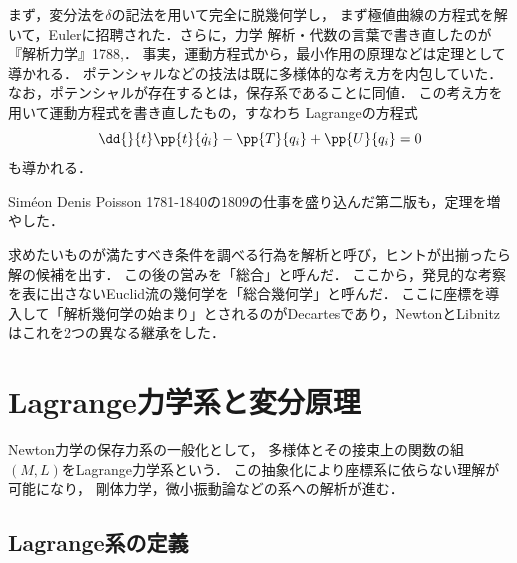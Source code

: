 \documentclass[uplatex,dvipdfmx]{jsreport}
\begin{document}
\begin{history}
    まず，変分法を$\delta$の記法を用いて完全に脱幾何学し，
    まず極値曲線の方程式を解いて，Eulerに招聘された．さらに，力学
    解析・代数の言葉で書き直したのが『解析力学』1788,\cite{Lagrange1788}．
    事実，運動方程式から，最小作用の原理などは定理として導かれる．
    ポテンシャルなどの技法は既に多様体的な考え方を内包していた．なお，ポテンシャルが存在するとは，保存系であることに同値．
    この考え方を用いて運動方程式を書き直したもの，すなわち
    Lagrangeの方程式
    \[\dd{}{t}\pp{t}{\dot{q}_i}-\pp{T}{q_i}+\pp{U}{q_i}=0\]
    も導かれる．

    Siméon Denis Poisson 1781-1840の1809の仕事を盛り込んだ第二版も，定理を増やした．
\end{history}

\begin{history}[解析の時代]
    求めたいものが満たすべき条件を調べる行為を解析と呼び，ヒントが出揃ったら解の候補を出す．
    この後の営みを「総合」と呼んだ．
    ここから，発見的な考察を表に出さないEuclid流の幾何学を「総合幾何学」と呼んだ．
    ここに座標を導入して「解析幾何学の始まり」とされるのがDecartesであり，NewtonとLibnitzはこれを2つの異なる継承をした．
\end{history}

\section{Lagrange力学系と変分原理}

\begin{tcolorbox}[colframe=ForestGreen, colback=ForestGreen!10!white,breakable,colbacktitle=ForestGreen!40!white,coltitle=black,fonttitle=\bfseries\sffamily,
title=]
    Newton力学の保存力系の一般化として，
    多様体とその接束上の関数の組$(M,L)$をLagrange力学系という．
    この抽象化により座標系に依らない理解が可能になり，
    剛体力学，微小振動論などの系への解析が進む．
\end{tcolorbox}

\subsection{Lagrange系の定義}
\end{document}
